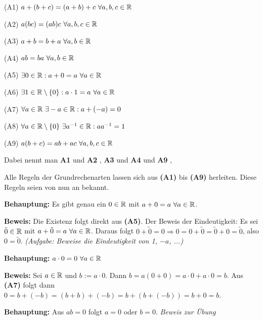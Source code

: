 \documentclass[a4paper,oneside,DIV15,BCOR12mm]{scrbook}
\begin{document}
\begin{axiom}[Körperaxiome]
\begin{liste}
\item[(A1)] $a+(b+c) = (a+b)+c \ \forall a,b,c \in \MdR$
\item[(A2)] $a(bc) = (ab)c \ \forall a,b,c \in \mathbb{R}$
\item[(A3)] $a+b = b+a \ \forall a,b \in \mathbb{R}$
\item[(A4)] $ab = ba \ \forall a,b \in \mathbb{R}$
\item[(A5)] $\exists 0 \in \mathbb{R}: a + 0 = a \ \forall a \in \mathbb{R}$
\item[(A6)] $\exists 1 \in \mathbb{R}\setminus\{0\}: a \cdot 1 = a \ \forall a \in \mathbb{R}$
\item[(A7)] $\forall a \in \MdR\ \exists -a \in \MdR: a + (-a) = 0 $
\item[(A8)] $\forall a \in \mathbb{R} \setminus \{0\}\ \exists a^{-1} \in \mathbb{R}: a a^{-1} = 1 $
\item[(A9)] $a(b+c) = ab + ac \ \forall a,b,c \in \MdR$
\end{liste}
\end{axiom}

Dabei nennt man \textbf{A1} und \textbf{A2} , \textbf{A3} und \textbf{A4}  und \textbf{A9} , 

Alle Regeln der Grundrechenarten lassen sich aus \textbf{(A1)} bis \textbf{(A9)} herleiten. Diese Regeln seien von nun an bekannt.

\begin{beispiele}
\item \textbf{Behauptung:} Es gibt genau ein $0 \in \mathbb{R}$ mit $a+0 = a \ \forall a\in \mathbb{R}$.

\textbf{Beweis:} Die Existenz folgt direkt aus \textbf{(A5)}. Der Beweis der Eindeutigkeit: Es sei $\tilde 0 \in \mathbb{R}$ mit $a+\tilde 0 = a \ \forall a \in \mathbb{R}$. Daraus folgt $0 + \tilde 0 = 0 \Rightarrow 0 = 0 + \tilde 0 = \tilde 0 + 0 = \tilde 0$, also $0 = \tilde 0$. \textit{(Aufgabe: Beweise die Eindeutigkeit von 1, $-a$, ...)}

\item \textbf{Behauptung:} $a \cdot 0 = 0 \ \forall a \in \mathbb{R}$

\textbf{Beweis:} Sei $a\in\mathbb{R}$ und $b := a \cdot 0$. Dann $b = a(0+0) = a \cdot 0 + a \cdot 0 = b$. Aus \textbf{(A7)} folgt dann $0 = b + (-b) = (b+b)+(-b) = b + (b+ (-b)) = b + 0  =b$.

\item

\textbf{Behauptung:} Aus $ab= 0$ folgt $a = 0$ oder $b=0$. \textit{Beweis zur Übung}

\end{beispiele}
\end{document}
